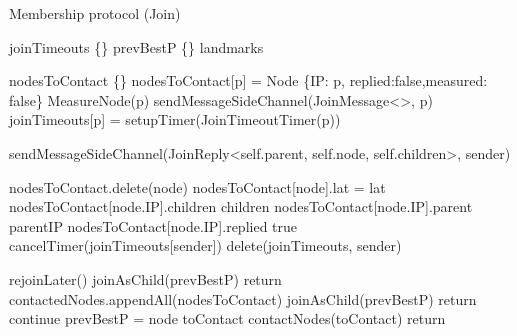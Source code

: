 \begin{algorithm}
\caption{Membership protocol (Join)}
\begin{algorithmic}[1]


 \label{alg:memb:join:init}
    \State joinTimeouts \asdassign \{\}
    \State prevBestP \asdassign \{\}
    \State landmarks \asdassign [landmarks]
\asdend

    \State nodesToContact \asdassign \{\}
        \State nodesToContact[p] = Node \{IP: p, replied:false,measured: false\}
        \State MeasureNode(p) 
        \State sendMessageSideChannel(JoinMessage<>, p)
        \State joinTimeouts[p] = \asdassign setupTimer(JoinTimeoutTimer(p))
    \EndFor
\asdend

    \asdend

    \State sendMessageSideChannel(JoinReply<self.parent, self.node, self.children>, sender)
\asdend
    
            \State nodesToContact.delete(node)
        \Else
            \State nodesToContact[node].lat = lat
            \State nodesToContact[node.IP].children \asdassign children
            \State nodesToContact[node.IP].parent \asdassign parentIP
            \State nodesToContact[node.IP].replied \asdassign true
            \State cancelTimer(joinTimeouts[sender])
            \State delete(joinTimeouts, sender)
        \EndIf
\asdend

        {rejoinLater()}
        {joinAsChild(prevBestP) }
        \State return
    \EndIf
    \State contactedNodes.appendAll(nodesToContact)
            \State joinAsChild(prevBestP)
            \State return
        \EndIf
            \State continue 
        \EndIf
        \State prevBestP = node
        \State toContact \asdassign [c -> c.nrChildren >= config.minGroupSize]
        \State contactNodes(toContact)
        \State return
    \EndFor


\end{algorithmic}
\end{algorithm}

